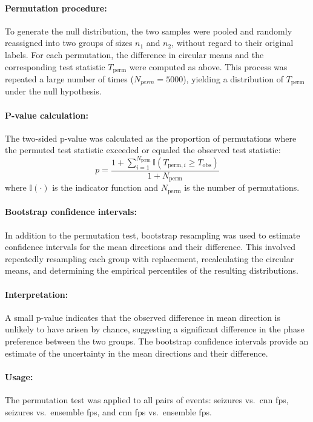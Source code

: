 \paragraph{Permutation procedure:}
To generate the null distribution, the two samples were pooled and randomly reassigned into two groups of sizes $n_1$ and $n_2$, without regard to their original labels.
For each permutation, the difference in circular means and the corresponding test statistic $T_{\text{perm}}$ were computed as above.
This process was repeated a large number of times ($N_{perm}=5000$), yielding a distribution of $T_{\text{perm}}$ under the null hypothesis.

\paragraph{P-value calculation:}
The two-sided p-value was calculated as the proportion of permutations where the permuted test statistic exceeded or equaled the observed test statistic:
\begin{equation} \label{eq:circ-pval}
    p = \frac{1 + \sum_{i=1}^{N_{\text{perm}}} \mathbb{I}(T_{\text{perm},i} \geq T_{\text{obs}})}{1 + N_{\text{perm}}}
\end{equation}
where $\mathbb{I}(\cdot)$ is the indicator function and $N_{\text{perm}}$ is the number of permutations.

\paragraph{Bootstrap confidence intervals:}
In addition to the permutation test, bootstrap resampling was used to estimate confidence intervals for the mean directions and their difference.
This involved repeatedly resampling each group with replacement, recalculating the circular means, and determining the empirical percentiles of the resulting distributions.

\paragraph{Interpretation:}
A small p-value indicates that the observed difference in mean direction is unlikely to have arisen by chance, suggesting a significant difference in the phase preference between the two groups.
The bootstrap confidence intervals provide an estimate of the uncertainty in the mean directions and their difference.

\paragraph{Usage:} The permutation test was applied to all pairs of events: seizures vs.\ \gls{cnn} \glspl{fp}, seizures vs.\ ensemble \glspl{fp}, and \gls{cnn} \glspl{fp} vs.\ ensemble \glspl{fp}.


